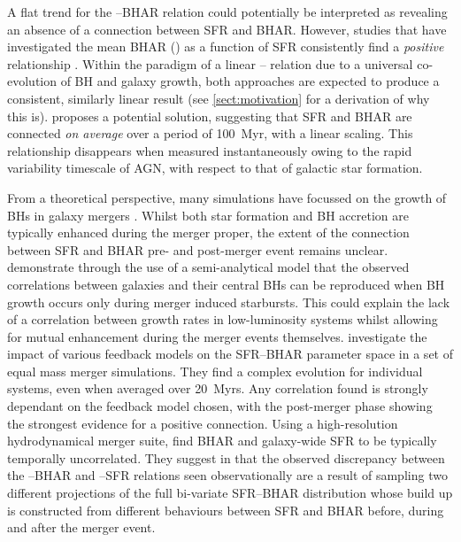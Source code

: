 A flat trend for the --BHAR relation could potentially be interpreted
as revealing an absence of a connection between SFR and BHAR. However, studies
that have investigated the mean BHAR () as a function of SFR
consistently find a \textit{positive} relationship
\citep[e.g,][]{Rafferty2011,Symeonidis2011,Mullaney2012a,Chen2013,Delvecchio2015}.
Within the paradigm of a linear -- relation due to a universal
co-evolution of BH and galaxy growth, both approaches are expected to produce a
consistent, similarly linear result (see \cref{sect:motivation} for a
derivation of why this is).  \citet{Hickox2014} proposes a potential solution,
suggesting that SFR and BHAR are connected \textit{on average} over a period of
100~Myr, with a linear scaling. This relationship disappears when measured
instantaneously owing to the rapid variability timescale of AGN, with respect
to that of galactic star formation.  

From a theoretical perspective, many simulations have focussed on the growth of
BHs in galaxy mergers \citep[e.g,][]{DiMatteo2005,Hopkins2005}. Whilst both
star formation and BH accretion are typically enhanced during the merger
proper, the extent of the connection between SFR and BHAR pre- and post-merger
event remains unclear. \citet{Neistein2014} demonstrate through the use of a
semi-analytical model that the observed correlations between galaxies and
their central BHs can be reproduced when BH growth occurs only during merger
induced starbursts. This could explain the lack of a correlation between growth
rates in low-luminosity systems whilst allowing for mutual enhancement during
the merger events themselves.  \citet{Thacker2014} investigate the impact of
various feedback models on the SFR--BHAR parameter space in a set of equal mass
merger simulations. They find a complex evolution for individual systems, even
when averaged over 20~Myrs. Any correlation found is strongly dependant on the
feedback model chosen, with the post-merger phase showing the strongest
evidence for a positive connection. Using a high-resolution hydrodynamical
merger suite, \citet{Volonteri2015a} find BHAR and galaxy-wide SFR to be
typically temporally uncorrelated. They suggest in \citet{Volonteri2015b} that
the observed discrepancy between the --BHAR and --SFR
relations seen observationally are a result of sampling two different
projections of the full bi-variate SFR--BHAR distribution whose build up is
constructed from different behaviours between SFR and BHAR before, during and
after the merger event. 

